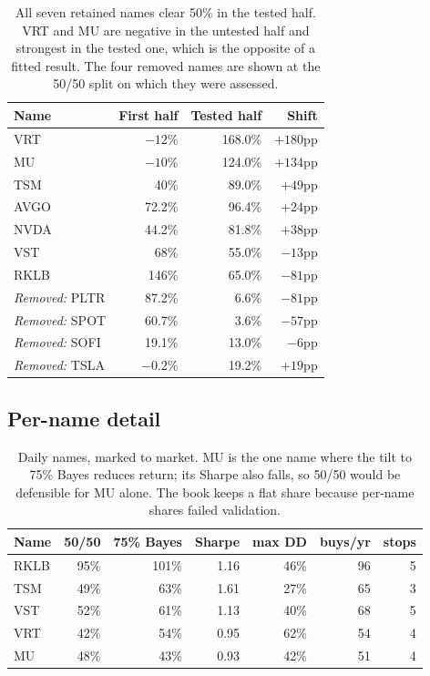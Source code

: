 \documentclass[11pt]{article}
\begin{document}
\begin{table}[H]\centering\small
\begin{tabular}{lrrr}
\toprule
\textbf{Name} & \textbf{First half} & \textbf{Tested half} & \textbf{Shift}\\
\midrule
\rowcolor{bckeep} VRT  & $-12$\% & 168.0\% & $+180$pp\\
MU   & $-10$\% & 124.0\% & $+134$pp\\
\rowcolor{bckeep} TSM  & 40\%  & 89.0\%  & $+49$pp\\
AVGO & 72.2\%  & 96.4\%  & $+24$pp\\
\rowcolor{bckeep} NVDA & 44.2\%  & 81.8\%  & $+38$pp\\
VST  & 68\%  & 55.0\%  & $-13$pp\\
\rowcolor{bckeep} RKLB & 146\% & 65.0\%  & $-81$pp\\
\midrule
\rowcolor{bcwarn} \textit{Removed:} PLTR & 87.2\% & 6.6\% & $-81$pp\\
\rowcolor{bcwarn} \textit{Removed:} SPOT & 60.7\% & 3.6\% & $-57$pp\\
\rowcolor{bcwarn} \textit{Removed:} SOFI & 19.1\% & 13.0\% & $-6$pp\\
\rowcolor{bcwarn} \textit{Removed:} TSLA & $-0.2$\% & 19.2\% & $+19$pp\\
\bottomrule
\end{tabular}
\caption{All seven retained names clear 50\% in the tested half. VRT and MU are negative in the
untested half and strongest in the tested one, which is the opposite of a fitted result. The four
removed names are shown at the 50/50 split on which they were assessed.}
\end{table}

\subsection{Per-name detail}

\begin{table}[H]\centering\small
\begin{tabular}{lrrrrrr}
\toprule
\textbf{Name} & \textbf{50/50} & \textbf{75\% Bayes} & \textbf{Sharpe} & \textbf{max DD} &
\textbf{buys/yr} & \textbf{stops}\\
\midrule
\rowcolor{bckeep} RKLB & 95\% & 101\% & 1.16 & 46\% & 96 & 5\\
TSM  & 49\% & 63\% & 1.61 & 27\% & 65 & 3\\
\rowcolor{bckeep} VST  & 52\% & 61\% & 1.13 & 40\% & 68 & 5\\
VRT  & 42\% & 54\% & 0.95 & 62\% & 54 & 4\\
\rowcolor{bckeep} MU   & 48\% & 43\% & 0.93 & 42\% & 51 & 4\\
\bottomrule
\end{tabular}
\caption{Daily names, marked to market. MU is the one name where the tilt to 75\% Bayes reduces
return; its Sharpe also falls, so 50/50 would be defensible for MU alone. The book keeps a flat
share because per-name shares failed validation.}
\end{table}
\end{document}
